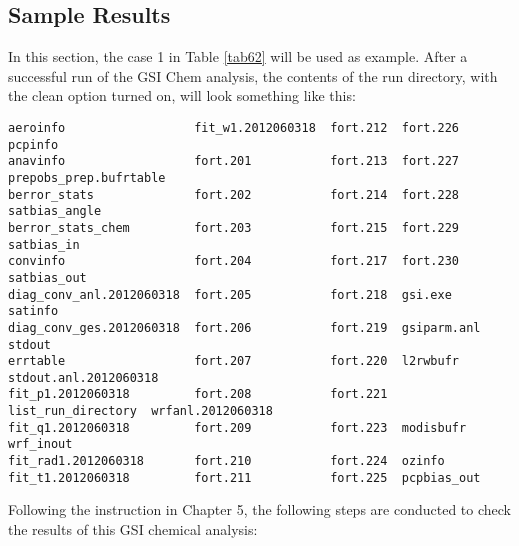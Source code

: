 \subsection{Sample Results}

In this section, the case 1 in Table \ref{tab62} will be used as example. After a successful run of the GSI Chem analysis, the contents of the run directory, with the clean option turned on, will look something like this:
\begin{scriptsize}
\begin{verbatim}
aeroinfo                  fit_w1.2012060318  fort.212  fort.226            pcpinfo
anavinfo                  fort.201           fort.213  fort.227            prepobs_prep.bufrtable
berror_stats              fort.202           fort.214  fort.228            satbias_angle
berror_stats_chem         fort.203           fort.215  fort.229            satbias_in
convinfo                  fort.204           fort.217  fort.230            satbias_out
diag_conv_anl.2012060318  fort.205           fort.218  gsi.exe             satinfo
diag_conv_ges.2012060318  fort.206           fort.219  gsiparm.anl         stdout
errtable                  fort.207           fort.220  l2rwbufr            stdout.anl.2012060318
fit_p1.2012060318         fort.208           fort.221  list_run_directory  wrfanl.2012060318
fit_q1.2012060318         fort.209           fort.223  modisbufr           wrf_inout
fit_rad1.2012060318       fort.210           fort.224  ozinfo
fit_t1.2012060318         fort.211           fort.225  pcpbias_out
\end{verbatim}
\end{scriptsize}

Following the instruction in Chapter 5, the following steps are conducted to check the results of this GSI chemical analysis:

